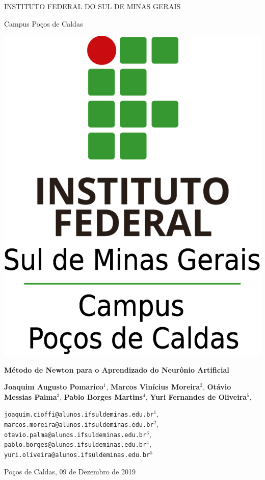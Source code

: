 \documentclass[12pt]{article}
\begin{document}
\justifying
\begin{center}
    \onehalfspacing
    
    \Large{INSTITUTO FEDERAL DO SUL DE MINAS GERAIS}
    
    \normalsize{Campus Poços de Caldas}
    
    \vspace{0.5cm}
    \includegraphics[scale=0.1]{img/pcs-logo.eps}
    
    \LARGE{\textbf{Método de Newton para o Aprendizado do Neurônio Artificial}}
    
    \large{\textbf{Joaquim Augusto Pomarico}$^{1}$, \textbf{Marcos Vinícius Moreira}$^{2}$, \textbf{Otávio Messias Palma}$^{3}$, \textbf{Pablo Borges Martins}$^{4}$, \textbf{Yuri Fernandes de Oliveira}$^{5}$,}
    
    \normalsize{\texttt{joaquim.cioffi@alunos.ifsuldeminas.edu.br$^{1}$}, \texttt{ marcos.moreira@alunos.ifsuldeminas.edu.br$^{2}$}, \texttt{ otavio.palma@alunos.ifsuldeminas.edu.br$^{3}$},\texttt{ pablo.borges@alunos.ifsuldeminas.edu.br$^{4}$},\texttt{ yuri.oliveira@alunos.ifsuldeminas.edu.br$^{5}$}}
    
    Poços de Caldas, 09 de Dezembro de 2019
\end{center}
\end{document}
